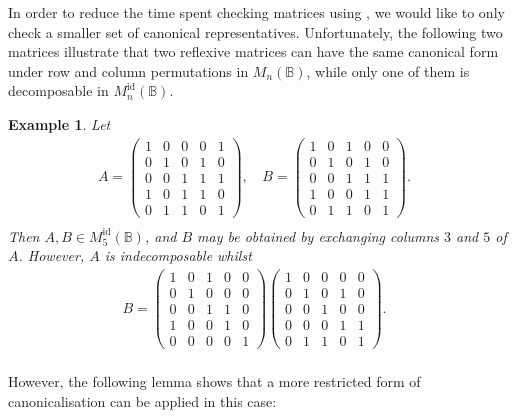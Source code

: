 \documentclass[11pt]{article}
\newtheorem{ex}[thm]{Example}
\numberwithin{equation}{section}
\newcommand{\B}{\mathbb{B}}
\newcommand{\Bn}{M_n(\B)}
\newcommand{\Refn}{M_n^{\text{id}}(\B)}
\newcommand{\Ref}[1]{M_{#1}^{\text{id}}(\B)}
\begin{document}
In order to reduce the time spent checking matrices using
, we would like to only check a smaller set of
canonical representatives. Unfortunately, the following two matrices illustrate
that two reflexive matrices can have the same canonical form under row and
column permutations in $\Bn$, while only one of them is decomposable in $\Refn$. 
\begin{ex}
  Let
\begin{align*}
  A = \begin{pmatrix}
    1 & 0 & 0 & 0 & 1 \\
    0 & 1 & 0 & 1 & 0 \\
    0 & 0 & 1 & 1 & 1 \\
    1 & 0 & 1 & 1 & 0 \\
    0 & 1 & 1 & 0 & 1 
  \end{pmatrix}\text{, }&
  B = \begin{pmatrix}
    1 & 0 & 1 & 0 & 0 \\
    0 & 1 & 0 & 1 & 0 \\
    0 & 0 & 1 & 1 & 1 \\
    1 & 0 & 0 & 1 & 1 \\
    0 & 1 & 1 & 0 & 1 
  \end{pmatrix}.&\\
\end{align*}
Then $A, B \in \Ref{5}$, and $B$ may be obtained by exchanging columns $3$ and
$5$ of $A$. However, $A$ is indecomposable whilst
\begin{align*}
  B = \begin{pmatrix}
    1 & 0 & 1 & 0 & 0 \\
    0 & 1 & 0 & 0 & 0 \\
    0 & 0 & 1 & 1 & 0 \\
    1 & 0 & 0 & 1 & 0 \\
    0 & 0 & 0 & 0 & 1 
  \end{pmatrix}
  \begin{pmatrix}
    1 & 0 & 0 & 0 & 0 \\
    0 & 1 & 0 & 1 & 0 \\
    0 & 0 & 1 & 0 & 0 \\
    0 & 0 & 0 & 1 & 1 \\
    0 & 1 & 1 & 0 & 1 
  \end{pmatrix}.&\\
\end{align*}
\end{ex} 

However, the following lemma shows that a more restricted form of
canonicalisation can be applied in this case:
\end{document}
